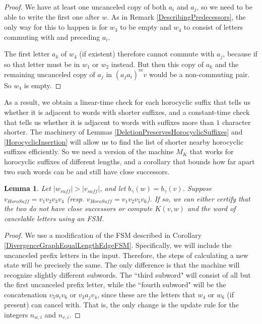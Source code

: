 \documentclass{amsart}
\newtheorem{lemma}[theorem]{Lemma}
\theoremstyle{definition}
\theoremstyle{remark}
\begin{document}
	\begin{proof}
		
		We have at least one uncanceled copy of both $a_i$ and $a_j$, so we need to be able to write the first one after $w$. As in Remark \ref{DescribingPredecessors}, the only way for this to happen is for $w_3$ to be empty and $w_4$ to consist of letters commuting with and preceding $a_i$.
		
		The first letter $a_k$ of $w_4$ (if existent) therefore cannot commute with $a_j$, because if so that letter must be in $w_1$ or $w_2$ instead. But then this copy of $a_k$ and the remaining uncanceled copy of $a_j$ in $(a_ja_i)^mv$ would be a non-commuting pair. So $w_4$ is empty.
	\end{proof}
	
	As a result, we obtain a linear-time check for each horocyclic suffix that tells us whether it is adjacent to words with shorter suffixes, and a constant-time check that tells us whether it is adjacent to words with suffixes more than $1$ character shorter. The machinery of Lemmas \ref{DeletionPreservesHorocyclicSuffixes} and \ref{HorocyclicInsertion} will allow us to find the list of shorter nearby horocyclic suffixes efficiently. So we need a version of the machine $M_K$ that works for horocyclic suffixes of different lengths, and a corollary that bounds how far apart two such words can be and still have close successors.
	
	\begin{lemma} \label{DivergenceGraphDifferentLengthEdgeFSM}
		Let $|w_{suff}|>|v_{suff}|$, and let $b_\gamma(w)=b_\gamma(v)$. Suppose $v_{HoroSuff}=v_1v_2v_3v_4$ (resp. $v_{HoroSuff}=v_1v_2v_5v_6$). If so, we can either certify that the two do not have close successors or compute $K(v,w)$ and the word of cancelable letters using an FSM.
	\end{lemma}
	
	\begin{proof}
		
		We use a modification of the FSM described in Corollary \ref{DivergenceGraphEqualLengthEdgeFSM}. Specifically, we will include the uncanceled prefix letters in the input. Therefore, the steps of calculating a new state will be precisely the same. The only difference is that the machine will recognize slightly different subwords. The ``third subword" will consist of all but the first uncanceled prefix letter, while the ``fourth subword" will be the concatenation $v_5a_iv_6$ or $v_3a_jv_4$, since these are the letters that $w_4$ or $w_6$ (if present) can cancel with. That is, the only change is the update rule for the integers $n_{w,i}$ and $n_{v, i}$. 
	\end{proof}
	
\end{document}
